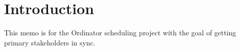 \documentclass[11pt]{article}
\begin{document}
	\section{Introduction}
	This memo is for the Ordinator scheduling project with the goal
	of getting primary stakeholders in sync.
	
	
	
	
	
\end{document}
